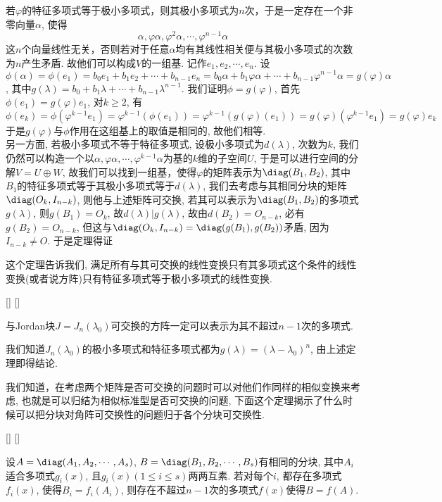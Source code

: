 \documentclass[UTF8]{ctexart}
\begin{document}
		\begin{prf}
			若$\varphi$的特征多项式等于极小多项式，则其极小多项式为$n$次，于是一定存在一个非零向量$\alpha$, 使得
			\[\alpha,\varphi\alpha,\varphi^2\alpha,\cdots,\varphi^{n-1}\alpha\]
			这$n$个向量线性无关，否则若对于任意$\alpha$均有其线性相关便与其极小多项式的次数为$n$产生矛盾. 故他们可以构成$V$的一组基. 记作$e_1,e_2,\cdots,e_n$. 设
			\[\phi(\alpha)=\phi(e_1)=b_0e_1+b_1e_2+\cdots+b_{n-1}e_n=b_0\alpha+b_1\varphi\alpha+\cdots+b_{n-1}\varphi^{n-1}\alpha=g(\varphi)\alpha\], 
			其中$g(\lambda)=b_0+b_1\lambda+\cdots+b_{n-1}\lambda^{n-1}$. 我们证明$\phi=g(\varphi)$, 首先$\phi(e_1)=g(\varphi)e_1$, 对$k\geq2$, 有
			\[\phi(e_k)=\phi(\varphi^{k-1}e_1)=\varphi^{k-1}(\phi(e_1))=\varphi^{k-1}(g(\varphi)(e_1))=g(\varphi)(\varphi^{k-1}e_1)=g(\varphi)e_k\]
			于是$g(\varphi)$与$\phi$作用在这组基上的取值是相同的, 故他们相等.\\
			另一方面, 若极小多项式不等于特征多项式, 设极小多项式为$d(\lambda)$, 次数为$k$, 我们仍然可以构造一个以${\alpha,\varphi\alpha,\cdots,\varphi^{k-1}\alpha}$为基的$k$维的子空间$U$, 于是可以进行空间的分解$V=U\oplus W$, 故我们可以找到一组基，使得$\varphi$的矩阵表示为$\diag(B_1,B_2)$, 其中$B_1$的特征多项式等于其极小多项式等于$d(\lambda)$, 我们去考虑与其相同分块的矩阵$\diag(O_k,I_{n-k})$, 则他与上述矩阵可交换, 若其可以表示为$\diag(B_1,B_2)$的多项式$g(\lambda)$, 则$g(B_1)=O_k$, 故$d(\lambda)|g(\lambda)$, 故由$d(B_2)=O_{n-k}$, 必有$g(B_2)=O_{n-k}$, 但这与$\diag(O_k,I_{n-k})=\diag(g(B_1),g(B_2))$矛盾, 因为$I_{n-k}\neq O$. 于是定理得证
		\end{prf}
		这个定理告诉我们, 满足所有与其可交换的线性变换只有其多项式这个条件的线性变换(或者说方阵)只有特征多项式等于极小多项式的线性变换.
		\begin{crl}
			[]
			{}
			[]
			[]
			
			与Jordan块$J=J_n(\lambda_0)$可交换的方阵一定可以表示为其不超过$n-1$次的多项式.
		\end{crl}
		\begin{prf}
			我们知道$J_n(\lambda_0)$的极小多项式和特征多项式都为$g(\lambda)=(\lambda-\lambda_0)^{n}$, 由上述定理即得结论. 
		\end{prf}
		我们知道，在考虑两个矩阵是否可交换的问题时可以对他们作同样的相似变换来考虑, 也就是可以归结为相似标准型是否可交换的问题, 下面这个定理揭示了什么时候可以把分块对角阵可交换性的问题归于各个分块可交换性.
		\begin{thm}
			[]
			{}
			[]
			[]
			
			设$A=\diag(A_1,A_2,\cdots,A_s)$, $B=\diag(B_1,B_2,\cdots,B_s)$有相同的分块, 其中$A_i$适合多项式$g_i(x)$, 且$g_i(x)(1\leq i\leq s)$两两互素. 若对每个$i$, 都存在多项式$f_i(x)$, 使得$B_i=f_i(A_i)$, 则存在不超过$n-1$次的多项式$f(x)$使得$B=f(A)$.
		\end{thm}
\end{document}
